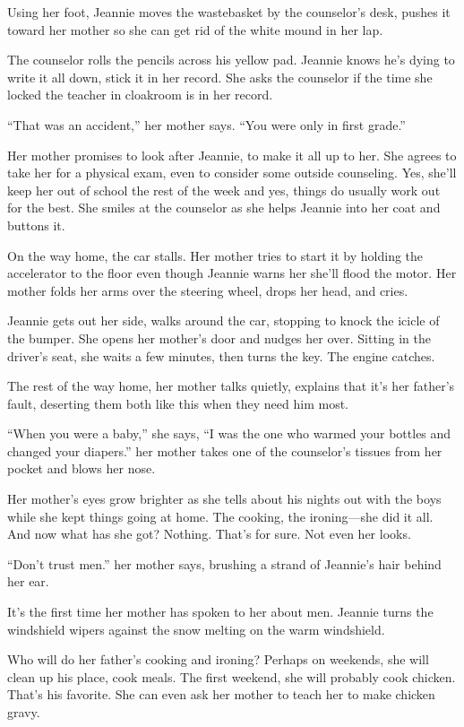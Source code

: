 \documentclass[twoside,10pt]{book}
\begin{document}
Using her foot, Jeannie moves the wastebasket by the counselor's desk,
pushes it toward her mother so she can get rid of the white mound in her
lap.

The counselor rolls the pencils across his yellow pad. Jeannie knows
he's dying to write it all down, stick it in her record. She asks the
counselor if the time she locked the teacher in cloakroom is in her
record.

``That was an accident,'' her mother says. ``You were only in first
grade.''

Her mother promises to look after Jeannie, to make it all up to her. She
agrees to take her for a physical exam, even to consider some outside
counseling. Yes, she'll keep her out of school the rest of the week and
yes, things do usually work out for the best. She smiles at the
counselor as she helps Jeannie into her coat and buttons it.

On the way home, the car stalls. Her mother tries to start it by holding
the accelerator to the floor even though Jeannie warns her she'll flood
the motor. Her mother folds her arms over the steering wheel, drops her
head, and cries.

Jeannie gets out her side, walks around the car, stopping to knock the
icicle of the bumper. She opens her mother's door and nudges her over.
Sitting in the driver's seat, she waits a few minutes, then turns the
key. The engine catches.

The rest of the way home, her mother talks quietly, explains that it's
her father's fault, deserting them both like this when they need him
most.

``When you were a baby,'' she says, ``I was the one who warmed your
bottles and changed your diapers.'' her mother takes one of the
counselor's tissues from her pocket and blows her nose.

Her mother's eyes grow brighter as she tells about his nights out with
the boys while she kept things going at home. The cooking, the
ironing---she did it all. And now what has she got? Nothing. That's for
sure. Not even her looks.

``Don't trust men.'' her mother says, brushing a strand of Jeannie's
hair behind her ear.

It's the first time her mother has spoken to her about men. Jeannie
turns the windshield wipers against the snow melting on the warm
windshield.

Who will do her father's cooking and ironing? Perhaps on weekends, she
will clean up his place, cook meals. The first weekend, she will
probably cook chicken. That's his favorite. She can even ask her mother
to teach her to make chicken gravy.
\end{document}
